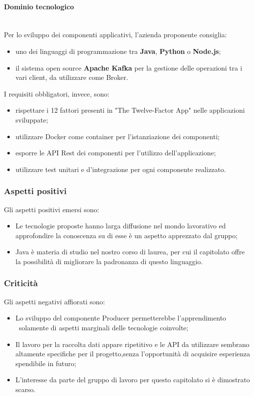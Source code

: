 \paragraph{Dominio tecnologico}\mbox{}\\
Per lo sviluppo dei componenti applicativi, l'azienda proponente consiglia:
\begin{itemize}
	\item uno dei linguaggi di programmazione tra \textbf{Java},
	\textbf{Python} o \textbf{Node.js};
	\item il sistema open source \textbf{Apache Kafka} per la gestione delle
	operazioni tra i vari client, da utilizzare come Broker.
\end{itemize}
I requisiti obbligatori, invece, sono:
\begin{itemize}
	\item rispettare i 12 fattori presenti in "The Twelve-Factor App" nelle 
	applicazioni sviluppate;
	\item utilizzare Docker come container per l'istanziazione dei componenti;
	\item esporre le API Rest dei componenti per l'utilizzo dell'applicazione; 
	\item utilizzare test unitari e d'integrazione per ogni componente 
	realizzato.
\end{itemize}
\subsubsection{Aspetti positivi}
Gli aspetti positivi emersi sono:
\begin{itemize}
	\item Le tecnologie proposte hanno larga diffusione nel mondo lavorativo ed
	 approfondire la conoscenza su di esse è un aspetto apprezzato dal gruppo;
	\item Java è materia di studio nel nostro corso di laurea, per cui il
	 capitolato offre la possibilità di migliorare la padronanza di questo
	 linguaggio.
\end{itemize}
\subsubsection{Criticità}
Gli aspetti negativi affiorati sono: 
\begin{itemize}
	\item Lo sviluppo del componente Producer permetterebbe l'apprendimento \
solamente di aspetti marginali delle tecnologie coinvolte;
	\item Il lavoro per la raccolta dati appare ripetitivo 
	 e le API da utilizzare sembrano altamente specifiche per il progetto,senza 
l'opportunità di acquisire esperienza spendibile in futuro;
	\item L'interesse da parte del gruppo di lavoro per questo capitolato si è 
dimostrato scarso.
	
\end{itemize}


